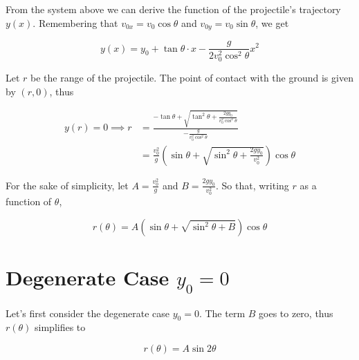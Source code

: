 \documentclass[a4paper,10pt]{article}
\begin{document}
From the system above we can derive the 
function of the projectile's trajectory $y(x)$.
Remembering that $v_{0x} = v_0\cos\theta$ and $v_{0y} = v_0\sin\theta$,
we get

\begin{equation}
    y(x) = y_0 + \tan\theta\cdot x - \frac{g}{2v_0^2\cos^2\theta}x^2
\end{equation}

Let $r$ be the range of the projectile.
The point of contact with the ground is given by $(r,0)$, thus

\begin{equation}
    \begin{aligned}
        y(r) = 0
        \implies r & = \frac{
            -\tan\theta
            + \sqrt{
                \tan^2\theta
                + \frac{
                    2gy_0
                }{
                    v_0^2\cos^2\theta
                }
            }
        }{
            -\frac{
                g
            }{
                v_0^2\cos^2\theta
            }
        }\\
        & = \frac{
            v_0^2
        }{
            g
        }
        \left(
            \sin\theta
            + \sqrt{
                \sin^2\theta
                + \frac{
                    2gy_0
                }{
                    v_0^2
                }
            }
        \right)
        \cos\theta
    \end{aligned}
\end{equation}

For the sake of simplicity, 
let $A = \frac{v_0^2}{g}$ 
and $B = \frac{2gy_0}{v_0^2}$.
So that, writing $r$ as a function of $\theta$,

\begin{equation}
    r(\theta) = A\left(
        \sin\theta
        + \sqrt{
            \sin^2\theta
            + B
        }
    \right)
    \cos\theta
\end{equation}

\section{Degenerate Case $y_0=0$}

Let's first consider the degenerate case $y_0=0$.
The term $B$ goes to zero, thus $r(\theta)$ simplifies to

\begin{equation}
    r(\theta) = A\sin2\theta
\end{equation}
\end{document}
